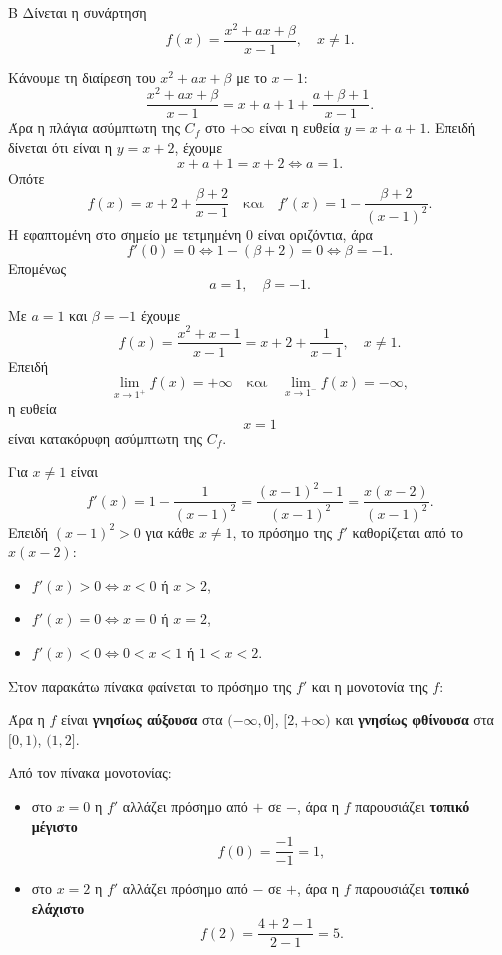 \begin{thema}{Β}
Δίνεται η συνάρτηση
\[
f(x)=\frac{x^2+ax+\beta}{x-1},\quad x\neq1.
\]

\begin{erwthma}
\item Κάνουμε τη διαίρεση του $x^2+ax+\beta$ με το $x-1$:
\[
\frac{x^2+ax+\beta}{x-1}
=x+a+1+\frac{a+\beta+1}{x-1}.
\]
Άρα η πλάγια ασύμπτωτη της $C_f$ στο $+\infty$ είναι η ευθεία $y=x+a+1$. Επειδή δίνεται ότι είναι η $y=x+2$, έχουμε
\[
x+a+1=x+2\Leftrightarrow a=1.
\]
Οπότε
\[
f(x)=x+2+\frac{\beta+2}{x-1}
\quad\text{και}\quad
f'(x)=1-\frac{\beta+2}{(x-1)^2}.
\]
Η εφαπτομένη στο σημείο με τετμημένη $0$ είναι οριζόντια, άρα
\[
f'(0)=0\Leftrightarrow 1-(\beta+2)=0\Leftrightarrow \beta=-1.
\]
Επομένως
\[
a=1,\quad \beta=-1.
\]

\item Με $a=1$ και $\beta=-1$ έχουμε
\[
f(x)=\frac{x^2+x-1}{x-1}=x+2+\frac{1}{x-1},\quad x\neq1.
\]
Επειδή
\[
\lim_{x\to1^+}f(x)=+\infty
\quad\text{και}\quad
\lim_{x\to1^-}f(x)=-\infty,
\]
η ευθεία
\[
x=1
\]
είναι κατακόρυφη ασύμπτωτη της $C_f$.

\item Για $x\neq1$ είναι
\[
f'(x)=1-\frac{1}{(x-1)^2}
=\frac{(x-1)^2-1}{(x-1)^2}
=\frac{x(x-2)}{(x-1)^2}.
\]
Επειδή $(x-1)^2>0$ για κάθε $x\neq1$, το πρόσημο της $f'$ καθορίζεται από το $x(x-2)$:
\begin{itemize}
\item $f'(x)>0\Leftrightarrow x<0$ ή $x>2$,
\item $f'(x)=0\Leftrightarrow x=0$ ή $x=2$,
\item $f'(x)<0\Leftrightarrow 0<x<1$ ή $1<x<2$.
\end{itemize}
Στον παρακάτω πίνακα φαίνεται το πρόσημο της $f'$ και η μονοτονία της $f$:
\begin{center}
\end{center}
Άρα η $f$ είναι \textbf{γνησίως αύξουσα} στα $(-\infty,0]$, $[2,+\infty)$ και \textbf{γνησίως φθίνουσα} στα $[0,1)$, $(1,2]$.

\item Από τον πίνακα μονοτονίας:
\begin{itemize}
\item στο $x=0$ η $f'$ αλλάζει πρόσημο από $+$ σε $-$, άρα η $f$ παρουσιάζει \textbf{τοπικό μέγιστο}
\[
f(0)=\frac{-1}{-1}=1,
\]
\item στο $x=2$ η $f'$ αλλάζει πρόσημο από $-$ σε $+$, άρα η $f$ παρουσιάζει \textbf{τοπικό ελάχιστο}
\[
f(2)=\frac{4+2-1}{2-1}=5.
\]
\end{itemize}
\end{erwthma}
\end{thema}

